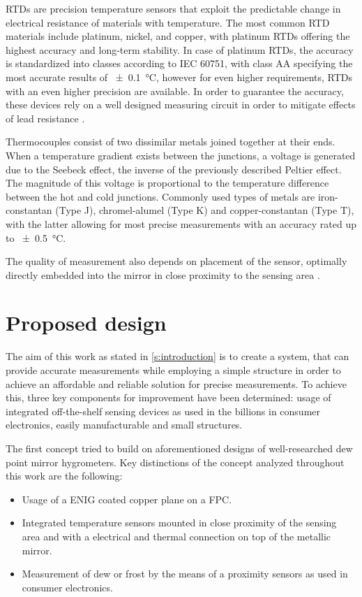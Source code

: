  \glspl{RTD} are precision temperature sensors that exploit the predictable change in electrical resistance of materials with temperature. The most common  \gls{RTD} materials include platinum, nickel, and copper, with platinum  \glspl{RTD} offering the highest accuracy and long-term stability. In case of platinum  \glspl{RTD}, the accuracy is standardized into classes according to IEC 60751, with class AA specifying the most accurate results of \qtylist{\pm 0.1}{\celsius}, however for even higher requirements,  \glspl{RTD} with an even higher precision are available. In order to guarantee the accuracy, these devices rely on a well designed measuring circuit in order to mitigate effects of lead resistance \autocite{wuBasicGuideRTD2018}.

Thermocouples consist of two dissimilar metals joined together at their ends. When a temperature gradient exists between the junctions, a voltage is generated due to the Seebeck effect, the inverse of the previously described Peltier effect. The magnitude of this voltage is proportional to the temperature difference between the hot and cold junctions. Commonly used types of metals are iron-constantan (Type J), chromel-alumel (Type K) and copper-constantan (Type T), with the latter allowing for most precise measurements with an accuracy rated up to \qty{\pm 0.5}{\celsius}.

The quality of measurement also depends on placement of the sensor, optimally directly embedded into the mirror in close proximity to the sensing area \autocite{hallAdvancementsMeasurementUncertainties2016}.




\section{Proposed design}
The aim of this work as stated in \cref{s:introduction} is to create a system, that can provide accurate measurements while employing a simple structure in order to achieve an affordable and reliable solution for precise measurements. To achieve this, three key components for improvement have been determined: usage of integrated off-the-shelf sensing devices as used in the billions in consumer electronics, easily manufacturable and small structures. 

The first concept tried to build on aforementioned designs of well-researched dew point mirror hygrometers. Key distinctions of the concept analyzed throughout this work are the following: 
\begin{itemize}
    \item Usage of a \gls{ENIG} coated copper plane on a \gls{FPC}.
    \item Integrated temperature sensors mounted in close proximity of the sensing area and with a electrical and thermal connection on top of the metallic mirror.
    \item Measurement of dew or frost by the means of a proximity sensors as used in consumer electronics.
\end{itemize}


